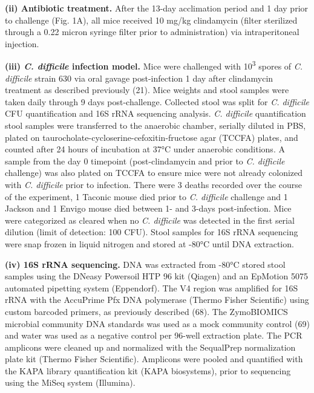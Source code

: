 \documentclass[
  11pt,
]{article}
\begin{document}
\textbf{(ii) Antibiotic treatment.} After the 13-day acclimation period
and 1 day prior to challenge (Fig. 1A), all mice received 10 mg/kg
clindamycin (filter sterilized through a 0.22 micron syringe filter
prior to administration) via intraperitoneal injection.

\textbf{(iii) \emph{C. difficile} infection model.} Mice were challenged
with 10\textsuperscript{3} spores of \emph{C. difficile} strain 630 via
oral gavage post-infection 1 day after clindamycin treatment as
described previously (21). Mice weights and stool samples were taken
daily through 9 days post-challenge. Collected stool was split for
\emph{C. difficile} CFU quantification and 16S rRNA sequencing analysis.
\emph{C. difficile} quantification stool samples were transferred to the
anaerobic chamber, serially diluted in PBS, plated on
taurocholate-cycloserine-cefoxitin-fructose agar (TCCFA) plates, and
counted after 24 hours of incubation at 37°C under anaerobic conditions.
A sample from the day 0 timepoint (post-clindamycin and prior to
\emph{C. difficile} challenge) was also plated on TCCFA to ensure mice
were not already colonized with \emph{C. difficile} prior to infection.
There were 3 deaths recorded over the course of the experiment, 1
Taconic mouse died prior to \emph{C. difficile} challenge and 1 Jackson
and 1 Envigo mouse died between 1- and 3-days post-infection. Mice were
categorized as cleared when no \emph{C. difficile} was detected in the
first serial dilution (limit of detection: 100 CFU). Stool samples for
16S rRNA sequencing were snap frozen in liquid nitrogen and stored at
-80°C until DNA extraction.

\textbf{(iv) 16S rRNA sequencing.} DNA was extracted from -80°C stored
stool samples using the DNeasy Powersoil HTP 96 kit (Qiagen) and an
EpMotion 5075 automated pipetting system (Eppendorf). The V4 region was
amplified for 16S rRNA with the AccuPrime Pfx DNA polymerase (Thermo
Fisher Scientific) using custom barcoded primers, as previously
described (68). The ZymoBIOMICS microbial community DNA standards was
used as a mock community control (69) and water was used as a negative
control per 96-well extraction plate. The PCR amplicons were cleaned up
and normalized with the SequalPrep normalization plate kit (Thermo
Fisher Scientific). Amplicons were pooled and quantified with the KAPA
library quantification kit (KAPA biosystems), prior to sequencing using
the MiSeq system (Illumina).
\end{document}
